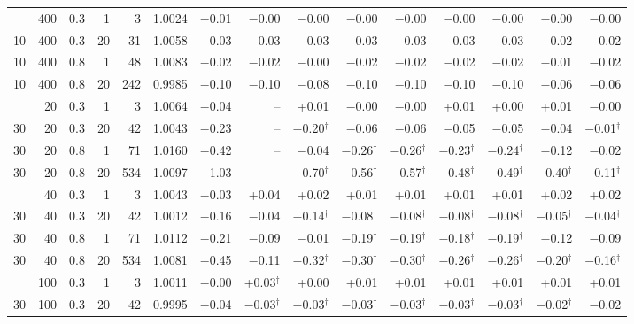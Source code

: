 \begin{tabular}{@{}rrrrr rrrrrrrrrr@{}}
\addlinespace[1pt]
10 & 400 & 0.3 & 1 & 3 & 1.0024 & $-$0.01 & $-$0.00 & $-$0.00 & $-$0.00 & $-$0.00 & $-$0.00 & $-$0.00 & $-$0.00 & $-$0.00 \\
10 & 400 & 0.3 & 20 & 31 & 1.0058 & $-$0.03 & $-$0.03 & $-$0.03 & $-$0.03 & $-$0.03 & $-$0.03 & $-$0.03 & $-$0.02 & $-$0.02 \\
10 & 400 & 0.8 & 1 & 48 & 1.0083 & $-$0.02 & $-$0.02 & $-$0.00 & $-$0.02 & $-$0.02 & $-$0.02 & $-$0.02 & $-$0.01 & $-$0.02 \\
10 & 400 & 0.8 & 20 & 242 & 0.9985 & $-$0.10 & $-$0.10 & $-$0.08 & $-$0.10 & $-$0.10 & $-$0.10 & $-$0.10 & $-$0.06 & $-$0.06 \\
\addlinespace[1pt]
30 & 20 & 0.3 & 1 & 3 & 1.0064 & $-$0.04 & -- & +0.01 & $-$0.00 & $-$0.00 & +0.01 & +0.00 & +0.01 & $-$0.00 \\
30 & 20 & 0.3 & 20 & 42 & 1.0043 & $-$0.23 & -- & $-$0.20$^{\dagger}$ & $-$0.06 & $-$0.06 & $-$0.05 & $-$0.05 & $-$0.04 & $-$0.01$^{\dagger}$ \\
30 & 20 & 0.8 & 1 & 71 & 1.0160 & $-$0.42 & -- & $-$0.04 & $-$0.26$^{\dagger}$ & $-$0.26$^{\dagger}$ & $-$0.23$^{\dagger}$ & $-$0.24$^{\dagger}$ & $-$0.12 & $-$0.02 \\
30 & 20 & 0.8 & 20 & 534 & 1.0097 & $-$1.03 & -- & $-$0.70$^{\dagger}$ & $-$0.56$^{\dagger}$ & $-$0.57$^{\dagger}$ & $-$0.48$^{\dagger}$ & $-$0.49$^{\dagger}$ & $-$0.40$^{\dagger}$ & $-$0.11$^{\dagger}$ \\
\addlinespace[1pt]
30 & 40 & 0.3 & 1 & 3 & 1.0043 & $-$0.03 & +0.04 & +0.02 & +0.01 & +0.01 & +0.01 & +0.01 & +0.02 & +0.02 \\
30 & 40 & 0.3 & 20 & 42 & 1.0012 & $-$0.16 & $-$0.04 & $-$0.14$^{\dagger}$ & $-$0.08$^{\dagger}$ & $-$0.08$^{\dagger}$ & $-$0.08$^{\dagger}$ & $-$0.08$^{\dagger}$ & $-$0.05$^{\dagger}$ & $-$0.04$^{\dagger}$ \\
30 & 40 & 0.8 & 1 & 71 & 1.0112 & $-$0.21 & $-$0.09 & $-$0.01 & $-$0.19$^{\dagger}$ & $-$0.19$^{\dagger}$ & $-$0.18$^{\dagger}$ & $-$0.19$^{\dagger}$ & $-$0.12 & $-$0.09 \\
30 & 40 & 0.8 & 20 & 534 & 1.0081 & $-$0.45 & $-$0.11 & $-$0.32$^{\dagger}$ & $-$0.30$^{\dagger}$ & $-$0.30$^{\dagger}$ & $-$0.26$^{\dagger}$ & $-$0.26$^{\dagger}$ & $-$0.20$^{\dagger}$ & $-$0.16$^{\dagger}$ \\
\addlinespace[1pt]
30 & 100 & 0.3 & 1 & 3 & 1.0011 & $-$0.00 & +0.03$^{\ddagger}$ & +0.00 & +0.01 & +0.01 & +0.01 & +0.01 & +0.01 & +0.01 \\
30 & 100 & 0.3 & 20 & 42 & 0.9995 & $-$0.04 & $-$0.03$^{\dagger}$ & $-$0.03$^{\dagger}$ & $-$0.03$^{\dagger}$ & $-$0.03$^{\dagger}$ & $-$0.03$^{\dagger}$ & $-$0.03$^{\dagger}$ & $-$0.02$^{\dagger}$ & $-$0.02 \\

\end{tabular}
